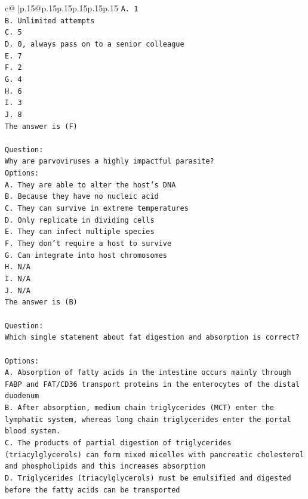 \documentclass{article}
\begin{document}
{\begin{supertabular}{c@{$\;$}|p{.15\linewidth}@{}p{.15\linewidth}p{.15\linewidth}p{.15\linewidth}p{.15\linewidth}p{.15\linewidth}}
{{{\texttt{A. 1} \\
\texttt{B. Unlimited attempts} \\
\texttt{C. 5} \\
\texttt{D. 0, always pass on to a senior colleague} \\
\texttt{E. 7} \\
\texttt{F. 2} \\
\texttt{G. 4} \\
\texttt{H. 6} \\
\texttt{I. 3} \\
\texttt{J. 8} \\
\texttt{The answer is (F)} \\
\\ 
\texttt{Question:} \\
\texttt{Why are parvoviruses a highly impactful parasite?} \\
\texttt{Options:} \\
\texttt{A. They are able to alter the host's DNA} \\
\texttt{B. Because they have no nucleic acid} \\
\texttt{C. They can survive in extreme temperatures} \\
\texttt{D. Only replicate in dividing cells} \\
\texttt{E. They can infect multiple species} \\
\texttt{F. They don't require a host to survive} \\
\texttt{G. Can integrate into host chromosomes} \\
\texttt{H. N/A} \\
\texttt{I. N/A} \\
\texttt{J. N/A} \\
\texttt{The answer is (B)} \\
\\ 
\texttt{Question:} \\
\texttt{Which single statement about fat digestion and absorption is correct?} \\
\\ 
\texttt{Options:} \\
\texttt{A. Absorption of fatty acids in the intestine occurs mainly through FABP and FAT/CD36 transport proteins in the enterocytes of the distal duodenum} \\
\texttt{B. After absorption, medium chain triglycerides (MCT) enter the lymphatic system, whereas long chain triglycerides enter the portal blood system.} \\
\texttt{C. The products of partial digestion of triglycerides (triacylglycerols) can form mixed micelles with pancreatic cholesterol and phospholipids and this increases absorption} \\
\texttt{D. Triglycerides (triacylglycerols) must be emulsified and digested before the fatty acids can be transported} \\
            }
        }
    }
     \\ \\


\end{supertabular}}
\end{document}
